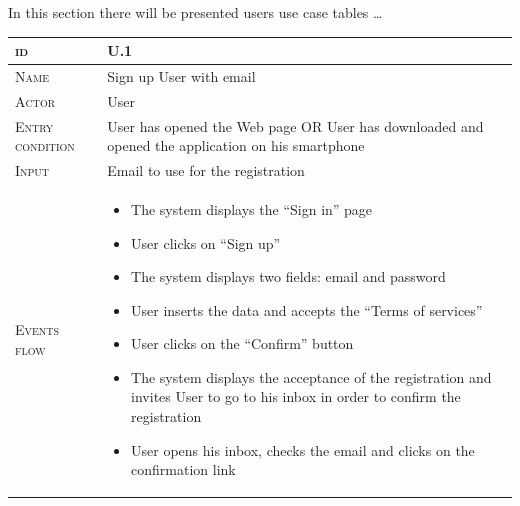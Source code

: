  In this section there will be presented users use case tables \ldots
\begin{table}[H]
    \centering
    \begin{tabular}[c]{|l|p{}|}
        \hline %
    	\textsc{id}                 &   U.1\\
    	\hline %
    	\textsc{Name}               &   Sign up User with email\\
    	\hline %
    	\textsc{Actor}             &   User\\
    	\hline %
    	\textsc{Entry condition}   &   User has opened the Web page OR User has downloaded and opened the application on his smartphone\\
    	\hline %
    	\textsc{Input}   &   Email to use for the registration\\
    	\hline %
    	\textsc{Events flow}         &   %
            	                        \begin{itemize}
                                    	    \item The system displays the “Sign in” page
                                            \item User clicks on “Sign up”
                                            \item The system displays two fields: email and password
                                            \item User inserts the data and accepts the “Terms of services”
                                            \item User clicks on the “Confirm” button
                                            \item The system displays the acceptance of the registration and invites User to go to his inbox in order to confirm the registration
                                            \item User opens his inbox, checks the email and clicks on the confirmation link


\end{itemize}
\end{tabular}
\end{table}
